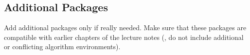 \documentclass{article}
\begin{document}
\subsection{Additional Packages}

Add additional packages only if really needed. Make sure that these packages are compatible with earlier chapters of the lecture notes (\eg, do not include additional or conflicting algorithm environments).



\end{document}
